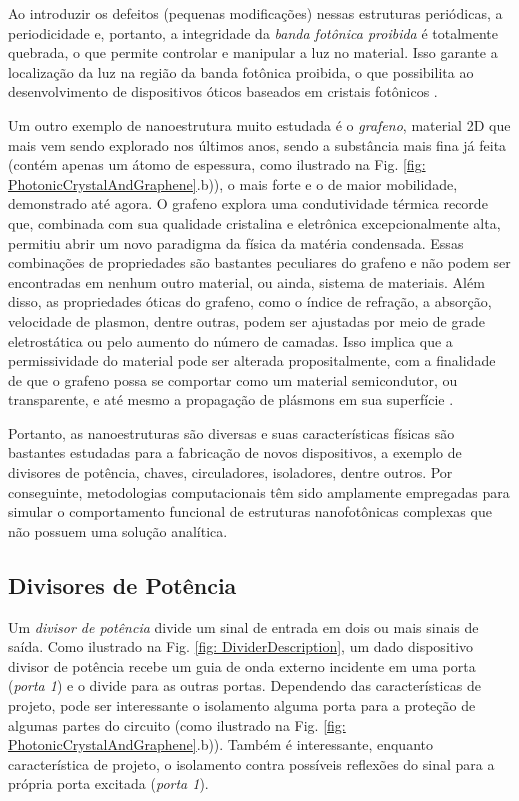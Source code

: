 Ao introduzir os defeitos (pequenas modificações) nessas estruturas periódicas, a periodicidade e, portanto, a integridade da \textit{banda fotônica proibida} é totalmente quebrada, o que permite controlar e manipular a luz \cite{yablonovitch1987inhibited} no material. Isso garante a localização da luz na região da banda fotônica proibida, o que possibilita ao desenvolvimento de dispositivos óticos baseados em cristais fotônicos \cite{john1987strong}.

Um outro exemplo de nanoestrutura muito estudada é o \textit{grafeno}, material 2D que mais vem sendo explorado nos últimos anos, sendo a substância mais fina já feita (contém apenas um átomo de espessura, como ilustrado na Fig. \ref{fig: PhotonicCrystalAndGraphene}.b)), o mais forte e o de maior mobilidade, demonstrado até agora. O grafeno explora uma condutividade térmica recorde que, combinada com sua qualidade cristalina e eletrônica excepcionalmente alta, permitiu abrir um novo paradigma da física da matéria condensada. Essas combinações de propriedades são bastantes peculiares do grafeno e não podem ser encontradas em nenhum outro material, ou ainda, sistema de materiais. Além disso, as propriedades óticas do grafeno, como o índice de refração, a absorção, velocidade de plasmon, dentre outras, podem ser ajustadas por meio de grade eletrostática ou pelo aumento do número de camadas. Isso implica que a permissividade do material pode ser alterada propositalmente, com a finalidade de que o grafeno possa se comportar como um material semicondutor, ou transparente, e até mesmo a propagação de plásmons em sua superfície \cite{Vitiello_2019}.

Portanto, as nanoestruturas são diversas e suas características físicas são bastantes estudadas para a fabricação de novos dispositivos, a exemplo de divisores de potência, chaves, circuladores, isoladores, dentre outros. Por conseguinte, metodologias computacionais têm sido amplamente empregadas para simular o comportamento funcional de estruturas nanofotônicas complexas que não possuem uma solução analítica.


\subsection{Divisores de Potência}

Um \textit{divisor de potência} divide um sinal de entrada em dois ou mais sinais de saída. Como ilustrado na Fig. \ref{fig: DividerDescription}, um dado dispositivo divisor de potência recebe um guia de onda externo incidente em uma porta (\textit{porta 1}) e o divide para as outras portas. Dependendo das características de projeto, pode ser interessante o isolamento alguma porta para a proteção de algumas partes do circuito (como ilustrado na Fig. \ref{fig: PhotonicCrystalAndGraphene}.b)). Também é interessante, enquanto característica de projeto, o isolamento contra possíveis reflexões do sinal para a própria porta excitada (\textit{porta 1}). 

